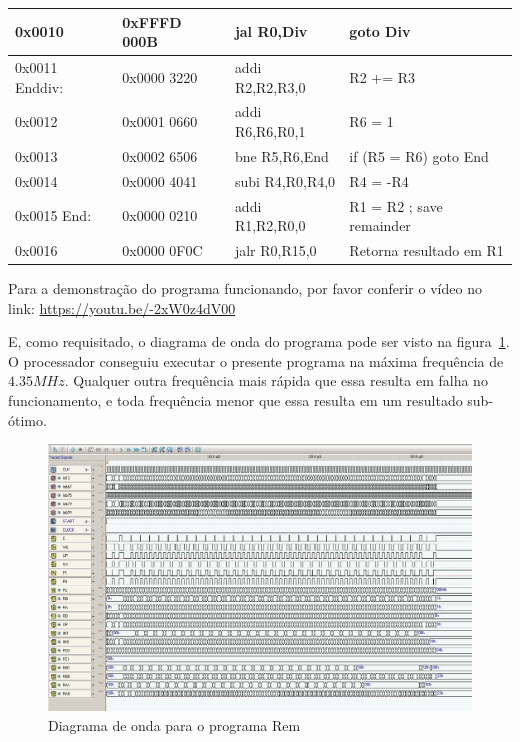 \documentclass[12pt]{article}
\begin{document}
\begin{table}[H]
\begin{tabular}{|l|l|l|l|}
        0x0010         & 0xFFFD 000B & jal  R0,Div          & goto Div                     \\\hline
        0x0011 Enddiv: & 0x0000 3220 & addi R2,R2,R3,0      & R2 += R3                     \\\hline
        0x0012         & 0x0001 0660 & addi R6,R6,R0,1      & R6 = 1                       \\\hline
        0x0013         & 0x0002 6506 & bne  R5,R6,End       & if (R5 \!= R6) goto End      \\\hline
        0x0014         & 0x0000 4041 & subi R4,R0,R4,0      & R4 = -R4                     \\\hline
        0x0015 End:    & 0x0000 0210 & addi R1,R2,R0,0      & R1 = R2 ; save remainder     \\\hline
        0x0016         & 0x0000 0F0C & jalr R0,R15,0        & Retorna resultado em R1      \\\hline
    \end{tabular}\label{tab:programs:rem}
\end{table}

Para a demonstração do programa funcionando, por favor conferir o vídeo no link:
\href{https://youtu.be/-2xW0z4dV00}{https://youtu.be/-2xW0z4dV00}

E, como requisitado, o diagrama de onda do programa pode ser visto na
figura~\ref{fig:program__rem_wave.png}. O processador conseguiu executar o
presente programa na máxima frequência de $4.35MHz$. Qualquer outra frequência
mais rápida que essa resulta em falha no funcionamento, e toda frequência menor
que essa resulta em um resultado sub-ótimo.

\begin{figure}[H]
    \centering
    \includegraphics[width=.9\textwidth]{Projeto/images/program__rem_wave.png}
    \caption{Diagrama de onda para o programa Rem}\label{fig:program__rem_wave.png}
\end{figure}
\end{document}
